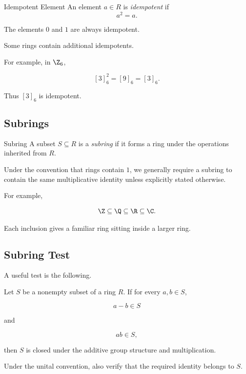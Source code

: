 \begin{definitionbox}{Idempotent Element}
An element \(a\in R\) is \emph{idempotent} if
\[ a^2=a. \]
\end{definitionbox}

The elements \(0\) and \(1\) are always idempotent.

Some rings contain additional idempotents.

For example, in \(\Z_6\),

\[ [3]_6^2=[9]_6=[3]_6. \]

Thus \([3]_6\) is idempotent.

\subsection{Subrings}
\label{subsec:subrings}

\begin{definitionbox}{Subring}
A subset \(S\subseteq R\) is a \emph{subring} if it forms a ring under the
operations inherited from \(R\).
\end{definitionbox}

Under the convention that rings contain \(1\), we generally require a subring
to contain the same multiplicative identity unless explicitly stated
otherwise.

For example,

\[ \Z\subseteq\Q\subseteq\R\subseteq\C. \]

Each inclusion gives a familiar ring sitting inside a larger ring.

\subsection{Subring Test}
\label{subsec:subring-test}

A useful test is the following.

\begin{theorem}
Let \(S\) be a nonempty subset of a ring \(R\). If for every \(a,b\in S\),

\[ a-b\in S \]

and

\[ ab\in S, \]

then \(S\) is closed under the additive group structure and multiplication.

Under the unital convention, also verify that the required identity belongs
to \(S\).
\end{theorem}

